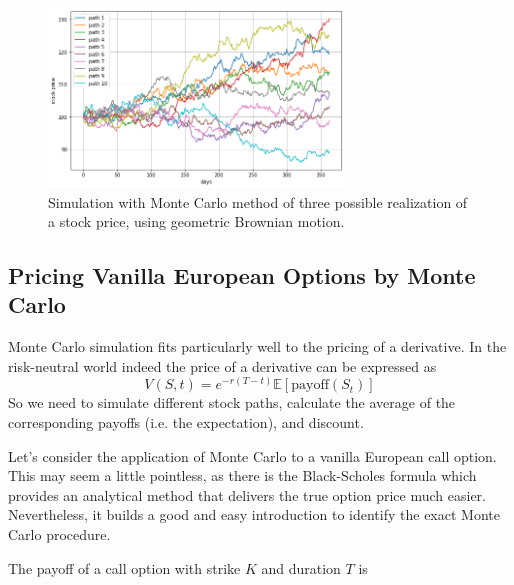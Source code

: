 \begin{figure}[htb]
	\centering
	\includegraphics[width=0.7\textwidth]{figures/asset_price_simulation.png}
	\caption{Simulation with Monte Carlo method of three possible realization of a stock price, using geometric Brownian motion.}
	\label{fig:stock_price_sim}
\end{figure}

\subsection{Pricing Vanilla European Options by Monte Carlo}
Monte Carlo simulation fits particularly well to the pricing of a derivative.
In the risk-neutral world indeed the price of a derivative can be expressed
as
\begin{equation}
V(S, t) = e^{-r(T-t)} \mathbb{E}[\textrm{payoff}(S_t)]
\end{equation}
So we need to simulate different stock paths,
calculate the average of the corresponding payoffs (i.e. the expectation), 
and discount.

%

Let's consider the application of Monte Carlo to a
vanilla European call option. This may seem a little pointless, as there
is the Black-Scholes formula which provides an analytical method that delivers the
true option price much easier. Nevertheless, it builds a good and easy
introduction to identify the exact Monte Carlo procedure. 

The payoff of a call option with strike $K$ and duration $T$ is 

